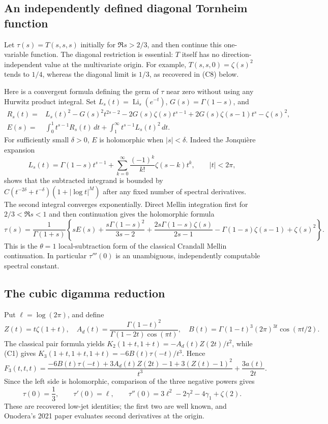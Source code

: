 \documentclass[11pt,letterpaper]{article}
\numberwithin{equation}{section}
\theoremstyle{definition}
\theoremstyle{remark}
\begin{document}
\subsection{An independently defined diagonal Tornheim function}

Let $\tau(s)=T(s,s,s)$ initially for $\Re s>2/3$, and then continue
this one-variable function.  The diagonal restriction is essential:
$T$ itself has no direction-independent value at the multivariate
origin. For example, $T(s,s,0)=\zeta(s)^2$ tends to $1/4$, whereas
the diagonal limit is $1/3$, as recovered in (C8) below.

Here is a convergent formula defining the germ of $\tau$ near zero
without using any Hurwitz product integral. Set
$L_s(t)=\operatorname{Li}_s(e^{-t})$, $G(s)=\Gamma(1-s)$, and
\begin{align*}
 R_s(t)={}&L_s(t)^2-G(s)^2t^{2s-2}
   -2G(s)\zeta(s)t^{s-1}
   +2G(s)\zeta(s-1)t^s-\zeta(s)^2,\\
 E(s)={}&\int_0^1t^{s-1}R_s(t)\,dt
          +\int_1^\infty t^{s-1}L_s(t)^2\,dt.
\end{align*}
For sufficiently small $\delta>0$, $E$ is holomorphic when $|s|<\delta$.
Indeed the Jonqui\`ere expansion \cite{DLMFPolylog}
\[
 L_s(t)=\Gamma(1-s)t^{s-1}
        +\sum_{k=0}^\infty\frac{(-1)^k}{k!}\zeta(s-k)t^k,
 \qquad |t|<2\pi,
\]
shows that the subtracted integrand is bounded by
$C(t^{-2\delta}+t^{-\delta})(1+|\log t|^M)$ after any fixed number
of spectral derivatives. The second integral converges exponentially.
Direct Mellin integration first for $2/3<\Re s<1$ and then continuation
gives the holomorphic formula
\[
 \tau(s)=\frac1{\Gamma(1+s)}\left\{
 sE(s)+\frac{s\Gamma(1-s)^2}{3s-2}
 +\frac{2s\Gamma(1-s)\zeta(s)}{2s-1}
 -\Gamma(1-s)\zeta(s-1)+\zeta(s)^2\right\}. \tag{C6}\label{cub:C6}
\]
This is the $\theta=1$ local-subtraction form of the classical
Crandall Mellin continuation. In particular $\tau'''(0)$ is an
unambiguous, independently computable spectral constant.

\subsection{The cubic digamma reduction}

Put $\ell=\log(2\pi)$, and define
\[
 Z(t)=t\zeta(1+t),\quad
 A_d(t)=\frac{\Gamma(1-t)^2}{\Gamma(1-2t)\cos(\pi t)},\quad
 B(t)=\Gamma(1-t)^3(2\pi)^{3t}\cos(\pi t/2).
\]
The classical pair formula yields
$K_2(1+t,1+t)=-A_d(t)Z(2t)/t^2$, while (C1) gives
$K_3(1+t,1+t,1+t)=-6B(t)\tau(-t)/t^3$. Hence
\[
 F_3(t,t,t)=
 \frac{-6B(t)\tau(-t)+3A_d(t)Z(2t)-1+3(Z(t)-1)^2}{t^3}
 +\frac{3a(t)}{2t}.                           \tag{C7}\label{cub:C7}
\]
Since the left side is holomorphic, comparison of the three negative
powers gives
\[
 \tau(0)=\frac13,\qquad
 \tau'(0)=\ell,\qquad
 \tau''(0)=3\ell^2-2\gamma^2-4\gamma_1+\zeta(2).\tag{C8}\label{cub:C8}
\]
These are recovered low-jet identities; the first two are well known,
and Onodera's 2021 paper evaluates second derivatives at the origin.
\end{document}
